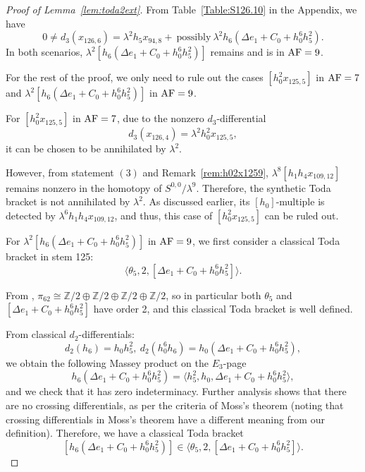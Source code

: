 \begin{proof}[Proof of Lemma~\ref{lem:toda2ext}]
From Table~\ref{Table:S126.10} in the Appendix, we have
$$0 \neq d_3(x_{126,6}) = \lambda^2 h_5 x_{94,8} + \ \text{possibly} \ \lambda^2 h_6(\Delta e_1 +C_0+h_0^6h_5^2).$$ 
In both scenarios, $\lambda^2 [h_6(\Delta e_1 +C_0+h_0^6h_5^2)]$ remains and is in $\mathrm{AF}=9$.

For the rest of the proof, we only need to rule out the cases $[h_0^2 x_{125,5}]$ in $\mathrm{AF}=7$ and $\lambda^2 [h_6(\Delta e_1 +C_0+h_0^6h_5^2)]$ in $\mathrm{AF}=9$. 

For $[h_0^2 x_{125,5}]$ in $\mathrm{AF}=7$, due to the nonzero $d_3$-differential
$$d_3(x_{126,4}) = \lambda^2 h_0^2 x_{125,5},$$
it can be chosen to be annihilated by $\lambda^2$. 

However, from statement $(3)$ and Remark~\ref{rem:h02x1259}, $\lambda^8 [h_1h_4x_{109,12}]$ remains nonzero in the homotopy of $S^{0,0}/\lambda^9$. Therefore, the synthetic Toda bracket is not annihilated by $\lambda^2$. As discussed earlier, its $[h_0]$-multiple is detected by $\lambda^6 h_1h_4x_{109,12}$, and thus, this case of $[h_0^2 x_{125,5}]$ can be ruled out.



For $\lambda^2 [h_6(\Delta e_1 +C_0+h_0^6h_5^2)]$ in $\mathrm{AF}=9$, we first consider a classical Toda bracket in stem 125:
$$\langle \theta_5, 2, [\Delta e_1 +C_0+h_0^6h_5^2] \rangle.$$

From \cite{Xu, IWX}, $\pi_{62} \cong \mathbb{Z}/2 \oplus \mathbb{Z}/2 \oplus \mathbb{Z}/2 \oplus \mathbb{Z}/2$, so in particular both $\theta_5$ and $[\Delta e_1 +C_0+h_0^6h_5^2]$ have order 2, and this classical Toda bracket is well defined.

From classical $d_2$-differentials:
$$d_2(h_6) = h_0h_5^2, \ d_2(h_0^6h_6)= h_0(\Delta e_1 +C_0+h_0^6h_5^2),$$
we obtain the following Massey product on the $E_3$-page
$$h_6(\Delta e_1 +C_0+h_0^6h_5^2) = \langle h_5^2, h_0, \Delta e_1 +C_0+h_0^6h_5^2 \rangle,$$
and we check that it has zero indeterminacy. Further analysis shows that there are no crossing differentials, as per the criteria of Moss's theorem \cite[Theorem~1.2]{Moss} (noting that crossing differentials in Moss's theorem have a different meaning from our definition). Therefore, we have a classical Toda bracket 
$$[h_6(\Delta e_1 +C_0+h_0^6h_5^2)] \in \langle \theta_5, 2, [\Delta e_1 +C_0+h_0^6h_5^2] \rangle.$$


\end{proof}
